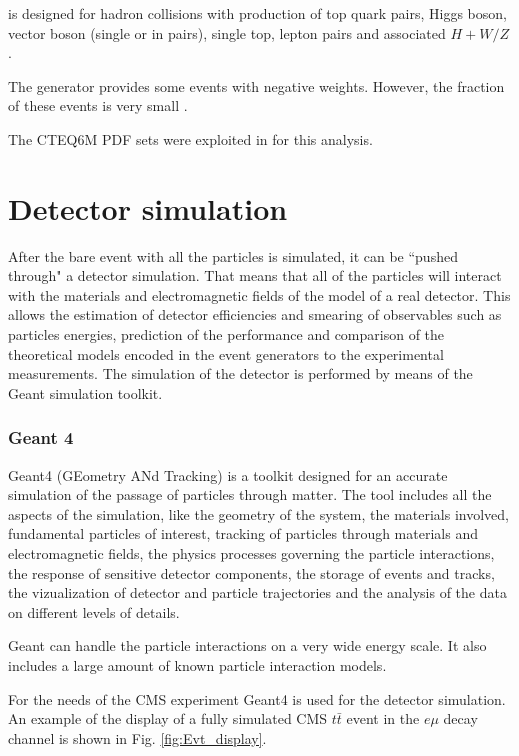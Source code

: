 \MCNLO is designed for hadron collisions with production of top quark pairs, Higgs boson, vector boson (single or in pairs), single top,
lepton pairs and associated $H+W/Z$.

The \MCNLO generator provides some events with negative weights. However, the fraction of these events is very small \cite{Frixione:2002ik}.

The CTEQ6M \cite{Pumplin:2002vw} PDF sets were exploited in \MCNLO for this analysis.


\section{Detector simulation}

After the bare event with all the particles is simulated, it can be ``pushed through" a detector simulation. That means that all of the particles 
will interact with the materials and electromagnetic fields of the model of a real detector. This allows the estimation of 
detector efficiencies and smearing of observables such as particles energies, prediction of the performance and comparison of the theoretical 
models encoded in the event generators to
the experimental measurements. The simulation of the detector is performed by means of the Geant simulation toolkit.

\subsubsection{Geant 4}

Geant4 (GEometry ANd Tracking) \cite{Agostinelli:2002hh} is a toolkit designed for an accurate simulation of the passage of particles through matter.
The tool includes all the aspects of the simulation, like the geometry of the system, the materials involved, fundamental particles of interest,
tracking of particles through materials and electromagnetic fields, the physics processes governing the particle interactions, the response of
sensitive detector components, the storage of events and tracks, the vizualization of detector and particle trajectories and the analysis of
the data on different levels of details.

Geant can handle the particle interactions on a very wide energy scale. It also includes a large amount of known particle interaction models.

For the needs of the CMS experiment Geant4 is used for the detector simulation. An example of the display of a fully simulated CMS $t\bar{t}$ event
in the $e\mu$ decay channel is shown in Fig. \ref{fig:Evt_display}.

